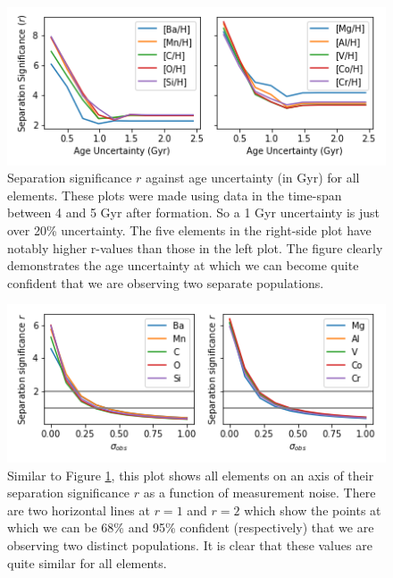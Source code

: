 \documentclass[fleqn,usenatbib]{mnras}
\begin{document}
\begin{figure}
	\includegraphics[width=\columnwidth]{same_axis_r_age.png}
    \caption{Separation significance $r$ against age uncertainty (in Gyr) for all elements. These plots were made using data in the time-span between 4 and 5 Gyr after formation. So a 1 Gyr uncertainty is just over 20\% uncertainty. The five elements in the right-side plot have notably higher r-values than those in the left plot. The figure clearly demonstrates the age uncertainty at which we can become quite confident that we are observing two separate populations.}
    \label{fig:r_v_age}
\end{figure}

\begin{figure}
	\includegraphics[width=\columnwidth]{same_axis_r_sigma.png}
    \caption{Similar to Figure \ref{fig:r_v_age}, this plot shows all elements on an axis of their separation significance $r$ as a function of measurement noise. There are two horizontal lines at $r=1$ and $r=2$ which show the points at which we can be 68\% and 95\% confident (respectively) that we are observing two distinct populations. It is clear that these values are quite similar for all elements.}
    \label{fig:r_v_obs}
\end{figure}
\end{document}

